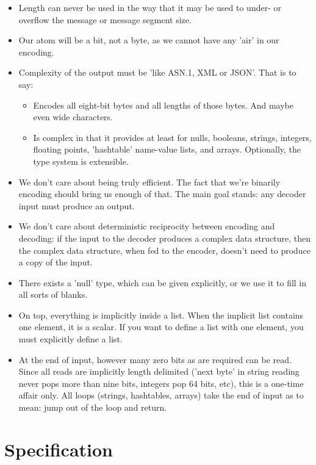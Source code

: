 \begin{itemize}
\item Length can never be used in the way that it may be used to 
  under- or overflow the message or message segment size.
\item Our atom will be a bit, not a byte, as we cannot have any 'air'
  in our encoding.
\item Complexity of the output must be 'like ASN.1, XML or JSON'.
  That is to say:
  \begin{itemize}
  \item Encodes all eight-bit bytes and all lengths of those bytes.
        And maybe even wide characters.
  \item Is complex in that it provides at least for nulls, booleans,
        strings, integers,
        floating points, 'hashtable' name-value lists, and arrays.
        Optionally, the type system is extensible.
  \end{itemize}
\item We don't care about being truly efficient. The fact that we're
  binarily encoding should bring us enough of that. The main goal stands:
  any decoder input must produce an output.
\item We don't care about deterministic reciprocity between encoding
  and decoding: if the input to the decoder produces
  a complex data structure, then the complex data structure, when fed
  to the encoder, doesn't need to produce a copy of the input.
\item There exists a 'null' type, which can be given explicitly, or
  we use it to fill in all sorts of blanks.
\item On top, everything is implicitly inside a list.
  When the implicit list contains
  one element, it is a scalar. If you want to define a list with
  one element, you must explicitly define a list.
\item At the end of input, however many zero bits as are required can be read.
  Since all reads are implicitly length delimited ('next byte' in string 
  reading never pops more than nine bits, integers pop 64 bits, etc),
  this is a one-time affair only. All loops (strings, hashtables, arrays)
  take the end of input as to mean: jump out of the loop and return.
\end{itemize}

\section{Specification}

